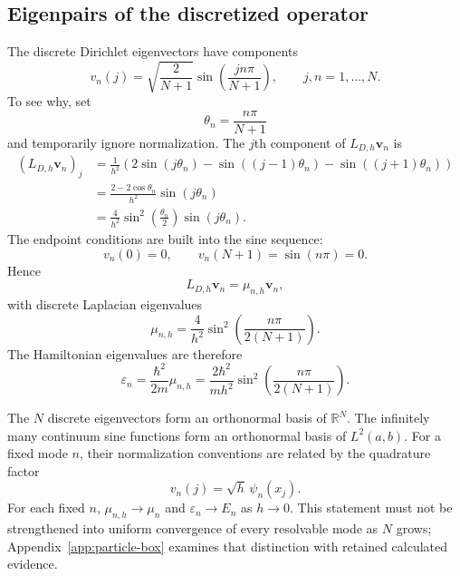 \subsection{Eigenpairs of the discretized operator}

The discrete Dirichlet eigenvectors have components
\begin{equation}
  v_n(j)
  =\sqrt{\frac{2}{N+1}}
   \sin\!\left(\frac{jn\pi}{N+1}\right),
  \qquad
  j,n=1,\ldots,N.
\end{equation}
To see why, set
\begin{equation}
  \theta_n=\frac{n\pi}{N+1}
\end{equation}
and temporarily ignore normalization. The \(j\)th component of
\(L_{D,h}\mathbf v_n\) is
\begin{align}
  (L_{D,h}\mathbf v_n)_j
  &=\frac{1}{h^2}
    \left(
      2\sin(j\theta_n)
      -\sin((j-1)\theta_n)
      -\sin((j+1)\theta_n)
    \right)\\
  &=\frac{2-2\cos\theta_n}{h^2}\sin(j\theta_n)\\
  &=\frac{4}{h^2}\sin^2\!\left(\frac{\theta_n}{2}\right)
    \sin(j\theta_n).
\end{align}
The endpoint conditions are built into the sine sequence:
\begin{equation}
  v_n(0)=0,
  \qquad
  v_n(N+1)=\sin(n\pi)=0.
\end{equation}
Hence
\begin{equation}
  L_{D,h}\mathbf v_n
  =\mu_{n,h}\mathbf v_n,
\end{equation}
with discrete Laplacian eigenvalues
\begin{equation}
  \mu_{n,h}
  =\frac{4}{h^2}
   \sin^2\!\left(\frac{n\pi}{2(N+1)}\right).
\end{equation}
The Hamiltonian eigenvalues are therefore
\begin{equation}
  \varepsilon_n
  =\frac{\hbar^2}{2m}\mu_{n,h}
  =\frac{2\hbar^2}{mh^2}
   \sin^2\!\left(\frac{n\pi}{2(N+1)}\right).
\end{equation}

The \(N\) discrete eigenvectors form an orthonormal basis of \(\mathbb R^N\).
The infinitely many continuum sine functions form an orthonormal basis of
\(L^2(a,b)\). For a fixed mode \(n\), their normalization conventions are
related by the quadrature factor
\begin{equation}
  v_n(j)
  =\sqrt{h}\,\psi_n(x_j).
\end{equation}
For each fixed \(n\), \(\mu_{n,h}\to\mu_n\) and
\(\varepsilon_n\to E_n\) as \(h\to0\). This statement must not be strengthened
into uniform convergence of every resolvable mode as \(N\) grows;
Appendix~\ref{app:particle-box} examines that distinction with retained
calculated evidence.

